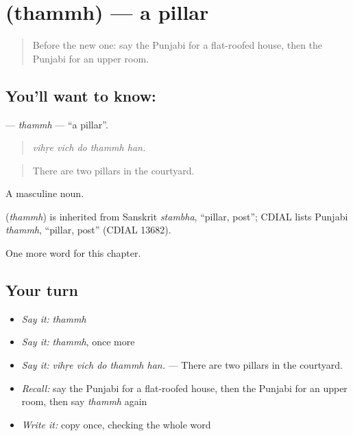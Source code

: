 \section[\texorpdfstring{\pa{ਥੰਮ੍ਹ} (thammh)}{ਥੰਮ੍ਹ (thammh)}]{ (thammh) — a pillar}

\label{lesson:PA-C245-thammh}



\begin{quote}
Before the new one: say the Punjabi for a flat-roofed house, then the Punjabi for an upper room.
\end{quote}

\subsection*{You'll want to know: }
\textbf{} — \emph{thammh} — \textquotedblleft{}a pillar\textquotedblright{}.

\begin{quote}
    
\end{quote}

\begin{quote}
\emph{vihṛe vich do thammh han.}
\end{quote}

\begin{quote}
There are two pillars in the courtyard.
\end{quote}

A masculine noun.

\begin{cousinweb}
\textbf{} (\emph{thammh}) is inherited from Sanskrit \emph{stambha}, \textquotedblleft{}pillar, post\textquotedblright{}; CDIAL lists Punjabi \emph{thammh}, \textquotedblleft{}pillar, post\textquotedblright{} (CDIAL 13682).
\end{cousinweb}

\begin{grammarlens}[title={What you've built}]
One more word for this chapter.
\end{grammarlens}

\subsection*{Your turn}
\begin{itemize}
\raggedright
  \item \emph{Say it:} \emph{thammh}
  \item \emph{Say it:} \emph{thammh}, once more
  \item \emph{Say it:} \emph{vihṛe vich do thammh han.} — There are two pillars in the courtyard.
  \item \emph{Recall:} say the Punjabi for a flat-roofed house, then the Punjabi for an upper room, then say \emph{thammh} again
  \item \emph{Write it:} copy \textbf{} once, checking the whole word
\end{itemize}


